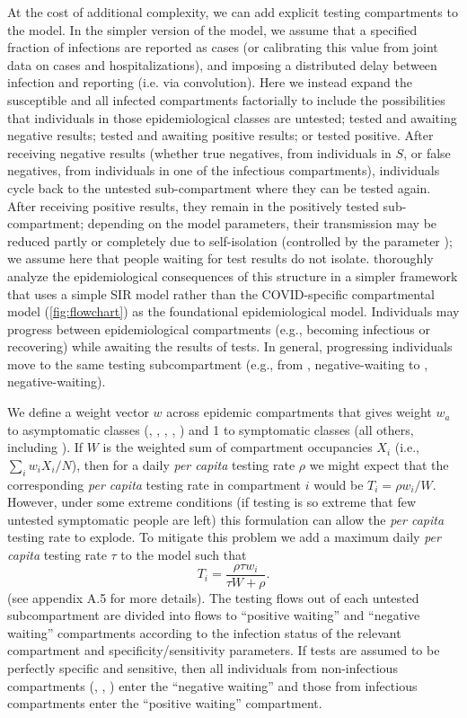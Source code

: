 \documentclass[12pt]{article}\usepackage[]{graphicx}\usepackage[]{color}
\begin{document}
At the cost of additional complexity, we can add explicit testing compartments to the model.
In the simpler version of the model, we assume that a specified fraction of infections
are reported as cases (or calibrating this value
from joint data on cases and hospitalizations), and imposing a
distributed delay between infection and reporting (i.e. via convolution).
Here we instead expand the susceptible
and all infected compartments factorially to include the possibilities that individuals in those epidemiological classes
are untested; tested and awaiting negative results; tested and awaiting positive results; or tested positive.
After receiving negative results (whether true negatives, from individuals in $S$, or false negatives,
from individuals in one of the infectious compartments), individuals cycle back to the untested sub-compartment
where they can be tested again. After receiving positive results, they remain in the positively tested sub-compartment;
depending on the model parameters, their transmission may be reduced partly or completely due to self-isolation (controlled by the parameter ); we assume here that people waiting for test results do not isolate.
\cite{Ghar+22} thoroughly analyze the epidemiological consequences of this structure in a simpler framework that uses
a simple SIR model rather than the COVID-specific compartmental model (\cref{fig:flowchart}) as the foundational
epidemiological model.
Individuals may progress between epidemiological compartments (e.g., becoming infectious or recovering)
while awaiting the results of tests. In general, progressing individuals move to the same testing subcompartment (e.g.,
from , negative-waiting to , negative-waiting).

We define a weight vector $w$ across epidemic compartments that gives weight $w_a$
to asymptomatic classes (, , , , ) and
1 to symptomatic classes (all others, including ).
If $W$ is the weighted sum of compartment occupancies $X_i$ (i.e., $\sum_i w_i X_i/N$),
then for a daily \emph{per capita} testing rate $\rho$ we might expect that the corresponding
\emph{per capita} testing rate in compartment $i$ would be $T_i = \rho w_i/W$. However, under some
extreme conditions (if testing is so extreme that few untested symptomatic people are left)
this formulation can allow the \emph{per capita} testing rate to explode. To mitigate this problem
we add a maximum daily \emph{per capita} testing rate $\tau$ to the model such that
\[
T_i = \frac{\rho \tau w_i}{\tau W + \rho} .
\]
(see \cite{Ghar+22} appendix A.5 for more details).
The testing flows out of each untested subcompartment are divided into flows to ``positive waiting''
and ``negative waiting'' compartments according to the infection status of the relevant compartment
and specificity/sensitivity parameters. If tests are assumed to be perfectly specific and sensitive,
then all individuals from non-infectious compartments (, , ) enter the
``negative waiting'' and those from infectious compartments enter the ``positive waiting'' compartment.
\end{document}
